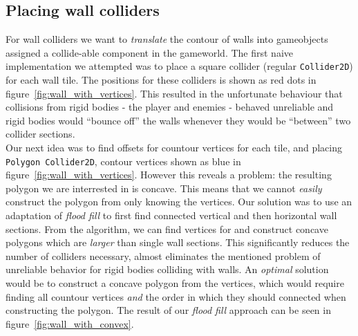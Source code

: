 \subsection{Placing wall colliders}
For wall colliders we want to \textit{translate} the contour of walls into
gameobjects assigned a collide-able component in the gameworld. The first naive
implementation we attempted was to place a square collider (regular
\texttt{Collider2D}) for each wall tile.
The positions for these colliders is shown as red dots in
figure~\ref{fig:wall_with_vertices}.
This resulted in the unfortunate behaviour that collisions from rigid bodies -
the player and enemies - behaved unreliable and rigid bodies would ``bounce off''
the walls whenever they would be ``between'' two collider sections.
\\
Our next idea was to find offsets for countour vertices for each tile, and
placing \texttt{Polygon Collider2D}, contour vertices shown as blue in
figure~\ref{fig:wall_with_vertices}. However this reveals a problem: the resulting
polygon we are interrested in is concave. This means that we cannot
\textit{easily} construct the polygon from only knowing the vertices. Our
solution was to use an adaptation of \textit{flood fill} to first find
connected vertical and then horizontal wall sections. From the algorithm, we
can find vertices for and construct concave polygons which are \textit{larger}
than single wall sections. This significantly reduces the number of colliders
necessary, almost eliminates the mentioned problem of unreliable behavior for
rigid bodies colliding with walls. An \textit{optimal} solution would be to
construct a concave polygon from the vertices, which would require finding all
countour vertices \textit{and} the order in which they should connected when
constructing the polygon. The result of our \textit{flood fill} approach can be
seen in figure~\ref{fig:wall_with_convex}.

